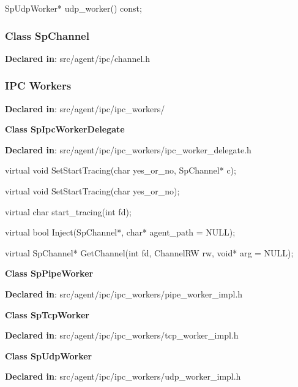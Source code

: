 \begin{apient}
SpUdpWorker* udp_worker() const;
\end{apient}
\apidesc{
}

\subsubsection{Class SpChannel}
\textbf{Declared in}: src/agent/ipc/channel.h

\subsubsection{IPC Workers}
\textbf{Declared in}: src/agent/ipc/ipc\_workers/

\textbf{Class SpIpcWorkerDelegate}

\textbf{Declared in}: src/agent/ipc/ipc\_workers/ipc\_worker\_delegate.h

\begin{apient}
virtual void SetStartTracing(char yes_or_no,
                             SpChannel* c);
\end{apient}
\apidesc{
}

\begin{apient}
virtual void SetStartTracing(char yes_or_no);
\end{apient}
\apidesc{
}

\begin{apient}
virtual char start_tracing(int fd);
\end{apient}
\apidesc{
}

\begin{apient}
virtual bool Inject(SpChannel*, char* agent_path = NULL);
\end{apient}
\apidesc{
}

\begin{apient}
virtual SpChannel* GetChannel(int fd,
                              ChannelRW rw,
                              void* arg = NULL);
\end{apient}
\apidesc{
}

\textbf{Class SpPipeWorker}

\textbf{Declared in}: src/agent/ipc/ipc\_workers/pipe\_worker\_impl.h

\textbf{Class SpTcpWorker}

\textbf{Declared in}: src/agent/ipc/ipc\_workers/tcp\_worker\_impl.h

\textbf{Class SpUdpWorker}

\textbf{Declared in}: src/agent/ipc/ipc\_workers/udp\_worker\_impl.h
